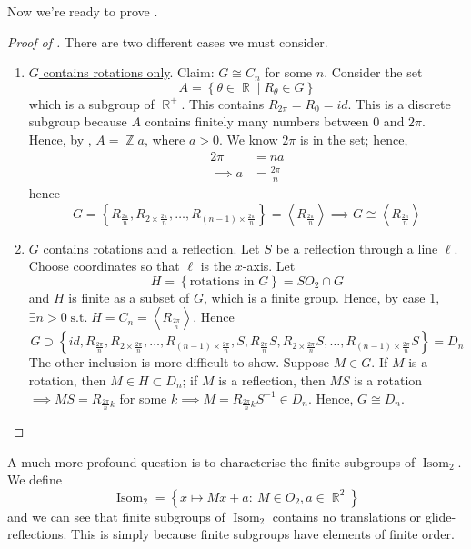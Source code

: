 \documentclass[11pt]{amsart} %
\theoremstyle{definition}
\theoremstyle{definition}
\DeclareMathOperator{\R}{\mathbb{R}}
\DeclareMathOperator{\Z}{\mathbb{Z}}
\DeclareMathOperator{\suchthat}{\text{ s.t. }}
\DeclareMathOperator{\isom}{Isom}
\numberwithin{equation}{section}
\newcommand{\condset}[4]{\left\{ #1  : \: #2 #3 #4 \right\}}
\begin{document}
Now we're ready to prove .

\begin{proof}[Proof of ]
	There are two different cases we must consider.
	\begin{enumerate}%
		\item \uline{$G$ contains rotations only}. Claim: $G \cong C_n$ for some $n$. Consider the set
		$$ A = \left\{ \theta \in \R \mid R_{\theta} \in G \right\} $$
		which is a subgroup of $\R^+$. This contains $R_{2\pi} = R_0 = id$. This is a discrete subgroup because $A$ contains finitely many numbers between $0 $ and $2\pi$. Hence, by , $A = \Z a$, where $a>0$. We know $2\pi$ is in the set; hence,
		\begin{align*}
		2 \pi&= na \\
		\implies a &= \frac{2\pi}{n}
		\end{align*}
		hence
		$$ G = \left\{ R_{\frac{2\pi}{n}}, R_{2 \times \frac{2\pi}{n}}, \dots, R_{ (n-1) \times \frac{2\pi}{n}
		 }  \right\} = \left\langle R_{\frac{2\pi}{n}} \right\rangle \implies G \cong \left\langle R_{\frac{2\pi}{n}} \right\rangle$$
		
		\item \uline{$G$ contains rotations and a reflection}. Let $S$ be a reflection through a line $\ell$. Choose coordinates so that $\ell$ is the $x$-axis. Let
		$$H= \left\{ \text{rotations in } G \right\} = SO_2 \cap G$$
		and $H$ is finite as a subset of $G$, which is a finite group. Hence, by case 1, $\exists n>0 \suchthat H= C_n = \left\langle R_{\frac{2\pi}{n}} \right\rangle$. Hence
		$$ G \supset \left\{ id, R_{\frac{2\pi}{n}}, R_{2 \times \frac{2\pi}{n}}, \dots, R_{ (n-1) \times \frac{2\pi}{n}}, S, R_{\frac{2\pi}{n}} S, R_{2 \times \frac{2\pi}{n}} S , \dots, R_{ (n-1) \times \frac{2\pi}{n}} S \right\} = D_n$$
		The other inclusion is more difficult to show. Suppose $M \in G$. If $M$ is a rotation, then $M \in H  \subset D_n$; if $M$ is a reflection, then $MS $ is a rotation$\implies MS = R_{\frac{2\pi}{n}k}$ for some $k \implies M =R_{\frac{2\pi}{n}k} S^{-1} \in D_n$. Hence, $G \cong D_n$.
	\end{enumerate}
\end{proof}

A much more profound question is to characterise the finite subgroups of $\isom_2$. We define
$$ \isom_2 = \condset{ x \mapsto Mx + a }{ M \in O_2}{,}{ a\in \R^2} $$
and we can see that finite subgroups of $\isom_2$ contains no translations or glide-reflections. This is simply because finite subgroups have elements of finite order.
\end{document}
